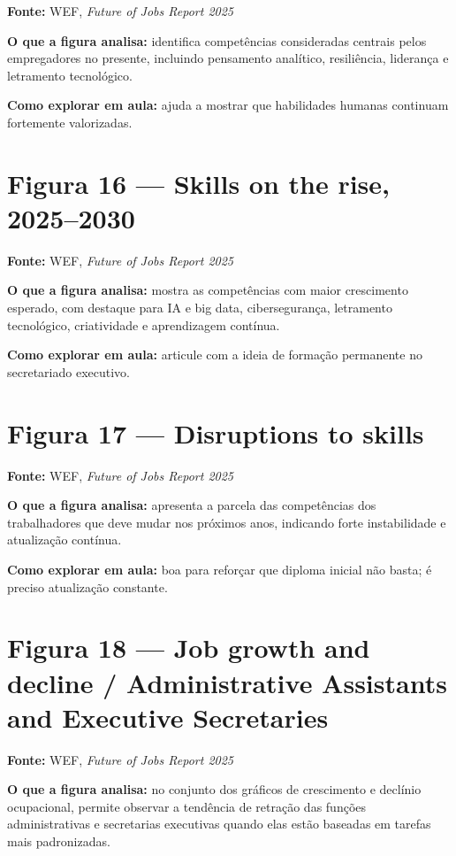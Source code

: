 \documentclass[
]{book}
\theoremstyle{definition}
\theoremstyle{definition}
\theoremstyle{definition}
\theoremstyle{definition}
\theoremstyle{remark}
\begin{document}
\textbf{Fonte:} WEF, \emph{Future of Jobs Report 2025}

\textbf{O que a figura analisa:} identifica competências consideradas centrais pelos empregadores no presente, incluindo pensamento analítico, resiliência, liderança e letramento tecnológico.

\textbf{Como explorar em aula:} ajuda a mostrar que habilidades humanas continuam fortemente valorizadas.

\section{Figura 16 --- Skills on the rise, 2025--2030}\label{figura-16-skills-on-the-rise-20252030}

\textbf{Fonte:} WEF, \emph{Future of Jobs Report 2025}

\textbf{O que a figura analisa:} mostra as competências com maior crescimento esperado, com destaque para IA e big data, cibersegurança, letramento tecnológico, criatividade e aprendizagem contínua.

\textbf{Como explorar em aula:} articule com a ideia de formação permanente no secretariado executivo.

\section{Figura 17 --- Disruptions to skills}\label{figura-17-disruptions-to-skills}

\textbf{Fonte:} WEF, \emph{Future of Jobs Report 2025}

\textbf{O que a figura analisa:} apresenta a parcela das competências dos trabalhadores que deve mudar nos próximos anos, indicando forte instabilidade e atualização contínua.

\textbf{Como explorar em aula:} boa para reforçar que diploma inicial não basta; é preciso atualização constante.

\section{Figura 18 --- Job growth and decline / Administrative Assistants and Executive Secretaries}\label{figura-18-job-growth-and-decline-administrative-assistants-and-executive-secretaries}

\textbf{Fonte:} WEF, \emph{Future of Jobs Report 2025}

\textbf{O que a figura analisa:} no conjunto dos gráficos de crescimento e declínio ocupacional, permite observar a tendência de retração das funções administrativas e secretarias executivas quando elas estão baseadas em tarefas mais padronizadas.
\end{document}
